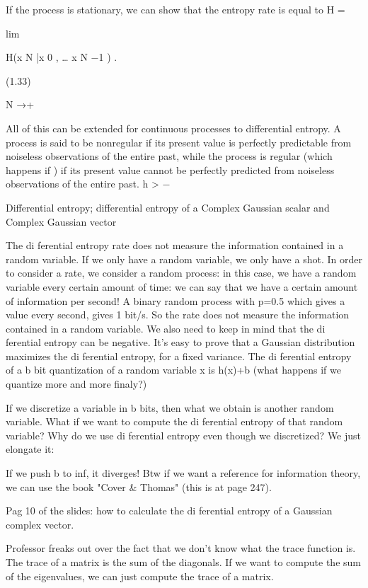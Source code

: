 If the process is stationary, we can show that the entropy rate is equal to H =

lim

H(x N |x 0 , … x N −1 ) .

(1.33)

N →+\infty

All of this can be extended for continuous processes to differential entropy.
A process is said to be nonregular if its present value is perfectly predictable from noiseless observations of the entire past, while the process is regular (which happens if
) if its present value cannot be perfectly predicted from noiseless observations of the entire past.
h > −\infty

Differential entropy; differential entropy of a Complex Gaussian scalar and Complex Gaussian vector

The di ferential entropy rate does not measure the information contained in a random variable.
If we only have a random variable, we only have a shot. In order to consider a rate, we consider a random process: in this case, we have a random variable every certain amount of time: we can say that we have a certain amount of information per second!
A binary random process with p=0.5 which gives a value every second, gives 1 bit/s.
So the rate does not measure the information contained in a random variable.
We also need to keep in mind that the di ferential entropy can be negative.
It's easy to prove that a Gaussian distribution maximizes the di ferential entropy, for a fixed variance.
The di ferential entropy of a b bit quantization of a random variable x is h(x)+b
(what happens if we quantize more and more finaly?)

If we discretize a variable in b bits, then what we obtain is another random variable. What if we want to compute the di ferential entropy of that random variable?
Why do we use di ferential entropy even though we discretized? We just elongate it:

If we push b to inf, it diverges!
Btw if we want a reference for information theory, we can use the book "Cover &
Thomas" (this is at page 247).

Pag 10 of the slides: how to calculate the di ferential entropy of a Gaussian complex vector.

Professor freaks out over the fact that we don't know what the trace function is.
The trace of a matrix is the sum of the diagonals.
If we want to compute the sum of the eigenvalues, we can just compute the trace of a matrix.

